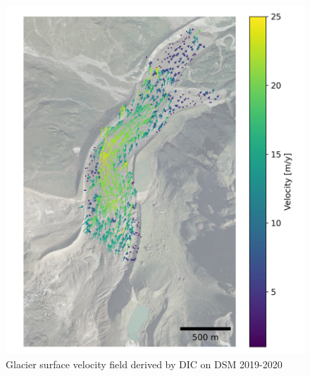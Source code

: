 \begin{figure}
    \centering
    \includegraphics[height=\textheight]{figures/chapter3/velocity_DIC_2019-2020.png}
    \caption[]{Glacier surface velocity field derived by DIC on DSM 2019-2020}
\end{figure}

